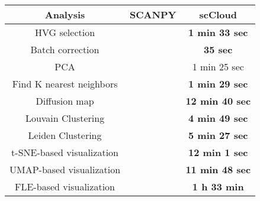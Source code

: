 \documentclass[10pt]{article}
\begin{document}
\begin{table}[H]
	\centering
	\begin{tabular}{|c|c|c|}
		\hline
		Analysis  & SCANPY & scCloud\\
		\hline \hline
		HVG selection  &  & \textbf{1 min 33 sec}  \\
		\hline
		Batch correction  &  & \textbf{35 sec}  \\
		\hline
		PCA   &  & 1 min 25 sec  \\
		\hline
		Find K nearest neighbors  &  & \textbf{1 min 29 sec}  \\
		\hline
		Diffusion map   &  & \textbf{12 min 40 sec}  \\
		\hline
		Louvain Clustering  &  & \textbf{4 min 49 sec}  \\
		\hline 
		Leiden Clustering &  & \textbf{5 min 27 sec}  \\
		\hline
		t-SNE-based visualization  &  & \textbf{12 min 1 sec}  \\
		\hline
		UMAP-based visualization  &  & \textbf{11 min 48 sec}  \\
		\hline
		FLE-based visualization   &  & \textbf{1 h 33 min}  \\
		\hline
	\end{tabular}
\end{table}
\end{document}
